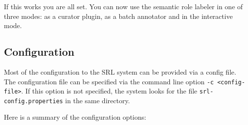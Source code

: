 \documentclass[11pt]{article}
\begin{document}
   

   If this works you are all set. You can now use the semantic role
   labeler in one of three modes: as a curator plugin, as a batch
   annotator and in the interactive mode.
\subsection{Configuration}
\label{sec-2_2}

   Most of the configuration to the SRL system can be provided via a
   config file. The configuration file can be specified via the
   command line option \texttt{-c <config-file>}. If this option is not
   specified, the system looks for the file \texttt{srl-config.properties} in
   the same directory.

   Here is a summary of the configuration options:
\end{document}
